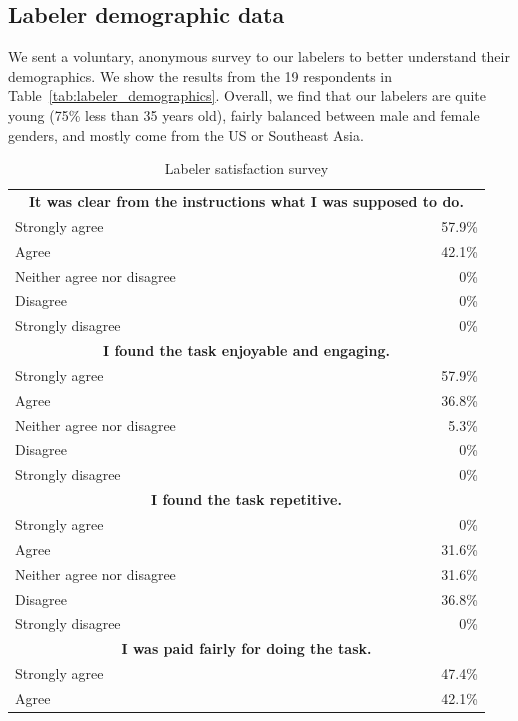 \documentclass{article}
\begin{document}
\subsection{Labeler demographic data}

We sent a voluntary, anonymous survey to our labelers to better understand their demographics. We show the results from the 19 respondents in Table~\ref{tab:labeler_demographics}. Overall, we find that our labelers are quite young (75\% less than 35 years old), fairly balanced between male and female genders, and mostly come from the US or Southeast Asia.

\begin{table}[]
    \centering
    \caption{Labeler satisfaction survey}
    \label{tab:labeler_satisfaction}
    \begin{tabular}{l r}
    \toprule 
        \multicolumn{2}{c}{~~\textbf{It was clear from the instructions what I was supposed to do.}~~}\\
         Strongly agree & 57.9\% \\
         Agree & 42.1\% \\
         Neither agree nor disagree  & 0\% \\
         Disagree & 0\% \\
         Strongly disagree  & 0\% \\ \midrule 
         \multicolumn{2}{c}{\textbf{I found the task enjoyable and engaging.}}\\
         Strongly agree & 57.9\% \\
         Agree & 36.8\% \\
         Neither agree nor disagree  & 5.3\% \\
         Disagree & 0\% \\
         Strongly disagree  & 0\% \\ \midrule
         \multicolumn{2}{c}{\textbf{I found the task repetitive.}}\\
         Strongly agree & 0\% \\
         Agree & 31.6\% \\
         Neither agree nor disagree  & 31.6\% \\
         Disagree & 36.8\% \\
         Strongly disagree  & 0\% \\ \midrule
         \multicolumn{2}{c}{\textbf{I was paid fairly for doing the task.}}\\
         Strongly agree & 47.4\% \\
         Agree & 42.1\% \\

\end{tabular}
\end{table}
\end{document}

